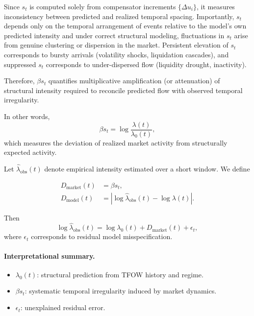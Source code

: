 Since $s_t$ is computed solely from compensator increments $\{\Delta u_i\}$, it measures inconsistency between predicted and realized temporal spacing. Importantly, $s_t$ depends only on the temporal arrangement of events relative to the model's own predicted intensity and under correct structural modeling, fluctuations in $s_t$ arise from genuine clustering or dispersion in the market. Persistent elevation of $s_t$ corresponds to bursty arrivals (volatility shocks, liquidation cascades), and suppressed $s_t$ corresponds to under-dispersed flow (liquidity drought, inactivity).

Therefore, $\beta s_t$ quantifies multiplicative amplification (or attenuation) of structural intensity required to reconcile predicted flow with observed temporal irregularity.

In other words,
%
\begin{equation}
\beta s_t
=
\log \frac{\lambda(t)}{\lambda_0(t)},
\end{equation}
%
which measures the deviation of realized market activity from structurally expected activity.


Let $\hat{\lambda}_{\text{obs}}(t)$ denote empirical intensity estimated over a short window. We define

\begin{align}
D_{\text{market}}(t)
&=
\beta s_t,
\\
D_{\text{model}}(t)
&=
\left|
\log \hat{\lambda}_{\text{obs}}(t)
-
\log \lambda(t)
\right|.
\end{align}

Then
%
\begin{equation}
\log \hat{\lambda}_{\text{obs}}(t)
=
\log \lambda_0(t)
+
D_{\text{market}}(t)
+
\epsilon_t,
\end{equation}
%
where $\epsilon_t$ corresponds to residual model misspecification.

\paragraph{Interpretational summary.}

\begin{itemize}
\item $\lambda_0(t)$: structural prediction from TFOW history and regime.
\item $\beta s_t$: systematic temporal irregularity induced by market dynamics.
\item $\epsilon_t$: unexplained residual error.
\end{itemize}

